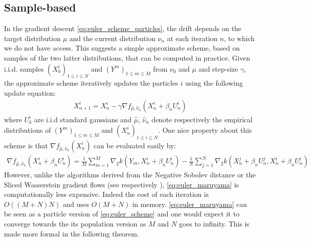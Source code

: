 
\subsection{Sample-based}

In the gradient descent \eqref{eq:euler_scheme_particles}, the drift depends on the target distribution $\mu$ and the current distribution $\nu_n$ at each iteration $n$, to which we do not have access. This suggests a simple approximate scheme, based on samples of the two latter distributions, that can be computed in practice. 
Given i.i.d. samples $(X^i_0)_{1\leq i\leq N}$ and $(Y^{m})_{1\leq m\leq M}$ from $\nu_0$ and $\mu$ and step-size $\gamma$, the approximate scheme iteratively updates the particles $i$ using the following update equation: 
\begin{align}\label{eq:euler_maruyama}
X_{n+1}^{i} = X_n^i -\gamma \nabla f_{\hat{\mu},\hat{\nu}_n}(X_n^i+\beta_n U_n^i)
\end{align}
where $U_{k}^{i}$ are i.i.d standard gaussians and $\hat{\mu}$, $\hat{\nu}_n$ denote respectively the empirical distributions of $(Y^{m})_{1\leq m\leq M}$ and $(X^i_n)_{1\leq i\leq N}$. One nice property about this scheme is that $\nabla f_{\hat{\mu},\hat{\nu}_n}(X_n^i)$ can be evaluated easily by:
\begin{align}
\nabla f_{\hat{\mu},\hat{\nu}_n}(X_n^i+\beta_n U_n^i) = \frac{1}{M}\sum_{m=1}^M \nabla_2 k(Y_m,X_n^i+\beta_n U_n^i)-\frac{1}{N}\sum_{j=1}^N \nabla_2 k(X_n^j+\beta_n U_n^j,X_n^i+\beta_n U_n^i)
\end{align}
%
However, unlike the algorithms derived from the Negative Sobolev distance or the Sliced Wasserstein gradient flows (see respectively \cite{Mroueh:2019,Simsekli:2018}), \cref{eq:euler_maruyama} is computationally less expensive. Indeed the cost of each iteration is $O((M+N)N)$ and uses $O(M+N)$ in memory.
\cref{eq:euler_maruyama} can be seen as a particle version of \cref{eq:euler_scheme} and one would expect it to converge towards the its population version as $M$ and $N$ goes to infinity. This is made more formal in the following theorem.
